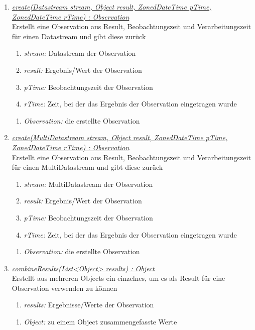 \begin{enumerate}[+]
\item \underline{\textit{create(Datastream stream, Object result, ZonedDateTime pTime,}}\\
\underline{\textit{ ZonedDateTime rTime) : Observation}}\\
Erstellt eine Observation aus Result, Beobachtungszeit und Verarbeitungszeit für einen Datastream und gibt diese zurück

\begin{enumerate}[$\bullet$]
\item \textit{stream:} Datastream der Observation
\item \textit{result:} Ergebnis/Wert der Observation
\item \textit{pTime:} Beobachtungszeit der Observation
\item \textit{rTime:} Zeit, bei der das Ergebnis der Observation eingetragen wurde
\end{enumerate}
\vspace{-0.2cm}
\begin{enumerate}[$\circ$]
\item \textit{Observation:} die erstellte Observation
\end{enumerate}


\item \underline{\textit{create(MultiDatastream stream, Object result, ZonedDateTime pTime,}}\\
\underline{\textit{ZonedDateTime rTime) : Observation}}\\
Erstellt eine Observation aus Result, Beobachtungszeit und Verarbeitungszeit für einen MultiDatastream und gibt diese zurück

\begin{enumerate}[$\bullet$]
\item \textit{stream:} MultiDatastream der Observation
\item \textit{result:} Ergebnis/Wert der Observation
\item \textit{pTime:} Beobachtungszeit der Observation
\item \textit{rTime:} Zeit, bei der das Ergebnis der Observation eingetragen wurde
\end{enumerate}
\vspace{-0.2cm}
\begin{enumerate}[$\circ$]
\item \textit{Observation:} die erstellte Observation
\end{enumerate}

\item \underline{\textit{combineResults(List<Object> results) : Object}}\\
Erstellt aus mehreren Objects ein einzelnes, um es als Result für eine Observation verwenden zu können


\begin{enumerate}[$\bullet$]
\item \textit{results:} Ergebnisse/Werte der Observation
\end{enumerate}
\vspace{-0.2cm}
\begin{enumerate}[$\circ$]
\item \textit{Object:} zu einem Object zusammengefasste Werte
\end{enumerate}


\end{enumerate}